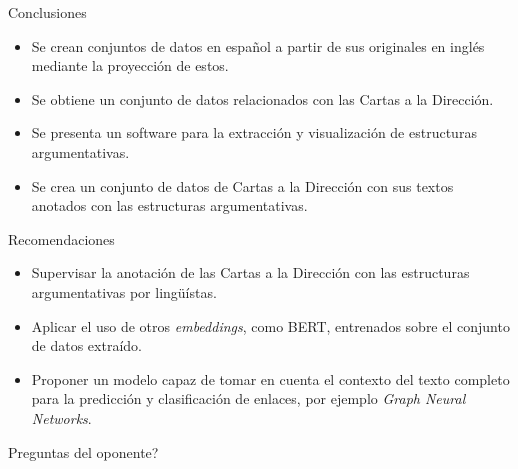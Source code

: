 \documentclass{beamer}
\begin{document}
\begin{frame}{Conclusiones}
    \begin{itemize}
        \item Se crean conjuntos de datos en español a partir de sus originales en inglés mediante la proyección de estos.
        \pause
        \item Se obtiene un conjunto de datos relacionados con las Cartas a la Dirección.
        \pause
        \item Se presenta un software para la extracción y visualización de estructuras argumentativas.
        \pause
        \item Se crea un conjunto de datos de Cartas a la Dirección con sus textos anotados con las estructuras argumentativas.
    \end{itemize}
\end{frame}

\begin{frame}{Recomendaciones}
    \begin{itemize}
        \item<1-> Supervisar la anotación de las Cartas a la Dirección con las estructuras argumentativas por lingüístas.
        \item<2-> Aplicar el uso de otros \textit{embeddings}, como BERT, entrenados sobre el conjunto 
        de datos extraído.
        \item<3-> Proponer un modelo capaz de tomar en cuenta el contexto del texto completo para la
        predicción y clasificación de enlaces, por ejemplo \textit{Graph Neural Networks}.
    \end{itemize}    
\end{frame}

\begin{frame}
    \titlepage 
\end{frame}
\logo{}

\begin{frame}{Preguntas del oponente?}
    
\end{frame}
\end{document}
